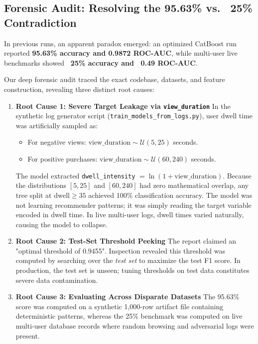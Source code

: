 \documentclass[11pt,a4paper]{article}
\begin{document}
\subsection{Forensic Audit: Resolving the 95.63\% vs. ~25\% Contradiction}
In previous runs, an apparent paradox emerged: an optimized CatBoost run reported \textbf{95.63\% accuracy and 0.9872 ROC-AUC}, while multi-user live benchmarks showed \textbf{~25\% accuracy and ~0.49 ROC-AUC}. 

Our deep forensic audit traced the exact codebase, datasets, and feature construction, revealing three distinct root causes:
\begin{enumerate}[leftmargin=*]
    \item \textbf{Root Cause 1: Severe Target Leakage via \texttt{view\_duration}}
    In the synthetic log generator script (\texttt{train\_models\_from\_logs.py}), user dwell time was artificially sampled as:
    \begin{itemize}
        \item For negative views: $\text{view\_duration} \sim \mathcal{U}(5, 25)$ seconds.
        \item For positive purchases: $\text{view\_duration} \sim \mathcal{U}(60, 240)$ seconds.
    \end{itemize}
    The model extracted \texttt{dwell\_intensity} $= \ln(1 + \text{view\_duration})$. Because the distributions $[5, 25]$ and $[60, 240]$ had zero mathematical overlap, any tree split at $\text{dwell} \ge 35$ achieved 100\% classification accuracy. The model was not learning recommender patterns; it was simply reading the target variable encoded in dwell time. In live multi-user logs, dwell times varied naturally, causing the model to collapse.
    
    \item \textbf{Root Cause 2: Test-Set Threshold Peeking}
    The report claimed an "optimal threshold of 0.9455". Inspection revealed this threshold was computed by searching over the \textit{test set} to maximize the test F1 score. In production, the test set is unseen; tuning thresholds on test data constitutes severe data contamination.
    
    \item \textbf{Root Cause 3: Evaluating Across Disparate Datasets}
    The 95.63\% score was computed on a synthetic 1,000-row artifact file containing deterministic patterns, whereas the 25\% benchmark was computed on live multi-user database records where random browsing and adversarial logs were present.
\end{enumerate}
\end{document}
